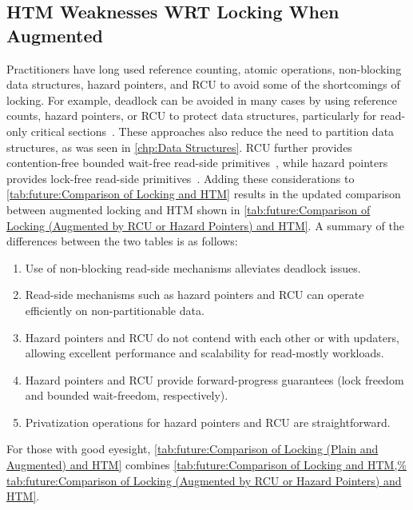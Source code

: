 \fi

\subsection{HTM Weaknesses WRT Locking When Augmented}
\label{sec:future:HTM Weaknesses WRT Locking When Augmented}



Practitioners have long used reference counting, atomic operations,
non-blocking data structures, hazard pointers, and RCU to avoid some
of the shortcomings of locking.
For example, deadlock can be avoided in many cases by using reference
counts, hazard pointers, or RCU to protect data structures,
particularly for read-only critical
sections~\cite{MagedMichael04a,HerlihyLM02,MathieuDesnoyers2012URCU,DinakarGuniguntala2008IBMSysJ,ThomasEHart2007a}.
These approaches also reduce the need to partition data
structures, as was seen in \cref{chp:Data Structures}.
RCU further provides contention-free bounded wait-free read-side
primitives~\cite{McKenney98,MathieuDesnoyers2012URCU}, while hazard pointers
provides lock-free read-side
primitives~\cite{Michael02a,HerlihyLM02,MagedMichael04a}.
Adding these considerations to
\cref{tab:future:Comparison of Locking and HTM}
results in the updated comparison between augmented locking and HTM
shown in
\cref{tab:future:Comparison of Locking (Augmented by RCU or Hazard Pointers) and HTM}.
A summary of the differences between the two tables is as follows:

\begin{enumerate}
\item	Use of non-blocking read-side mechanisms alleviates deadlock issues.
\item	Read-side mechanisms such as hazard pointers and RCU can operate
	efficiently on non-partitionable data.
\item	Hazard pointers and RCU do not contend with each other or with
	updaters, allowing excellent performance and scalability for
	read-mostly workloads.
\item	Hazard pointers and RCU provide forward-progress guarantees
	(lock freedom and bounded wait-freedom, respectively).
\item	Privatization operations for hazard pointers and RCU are
	straightforward.
\end{enumerate}



For those with good eyesight,
\cref{tab:future:Comparison of Locking (Plain and Augmented) and HTM}
combines
\cref{tab:future:Comparison of Locking and HTM,%
tab:future:Comparison of Locking (Augmented by RCU or Hazard Pointers) and HTM}.

